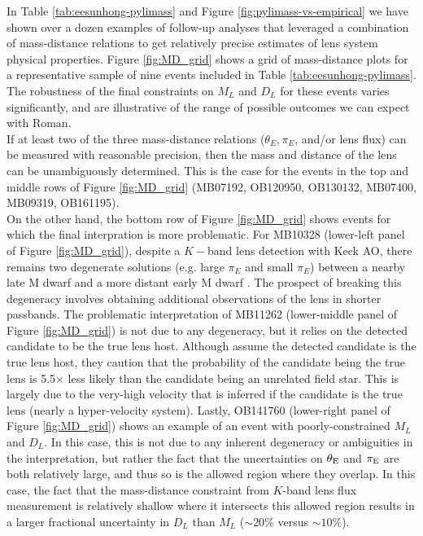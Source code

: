 \documentclass[twocolumn]{aastex631}
\begin{document}
\indent In Table \ref{tab:eesunhong-pylimass} and Figure \ref{fig:pylimass-vs-empirical} we have shown over a dozen examples of follow-up analyses that leveraged a combination of mass-distance relations to get relatively precise estimates of lens system physical properties. Figure \ref{fig:MD_grid} shows a grid of mass-distance plots for a representative sample of nine events included in Table \ref{tab:eesunhong-pylimass}. The robustness of the final constraints on $M_L$ and $D_L$ for these events varies significantly, and are illustrative of the range of possible outcomes we can expect with Roman.\\
\indent If at least two of the three mass-distance relations ($\theta_E, \pi_E$, and/or lens flux) can be measured with reasonable precision, then the mass and distance of the lens can be unambiguously determined. This is the case for the events in the top and middle rows of Figure \ref{fig:MD_grid} (MB07192, OB120950, OB130132, MB07400, MB09319, OB161195).\\
\indent On the other hand, the bottom row of Figure \ref{fig:MD_grid} shows events for which the final interpration is more problematic. For MB10328 (lower-left panel of Figure \ref{fig:MD_grid}), despite a $K-$band lens detection with Keck AO, there remains two degenerate solutions (e.g. large $\pi_E$ and small $\pi_E$) between a nearby late M dwarf and a more distant early M dwarf \citep{vandorou:2025b}. The prospect of breaking this degeneracy involves obtaining additional observations of the lens in shorter passbands. The problematic interpretation of MB11262 (lower-middle panel of Figure \ref{fig:MD_grid}) is not due to any degeneracy, but it relies on the detected candidate to be the true lens host. Although \cite{terry:2025a} assume the detected candidate is the true lens host, they caution that the probability of the candidate being the true lens is 5.5$\times$ less likely than the candidate being an unrelated field star. This is largely due to the very-high velocity that is inferred if the candidate is the true lens (nearly a hyper-velocity system). Lastly, OB141760 (lower-right panel of Figure \ref{fig:MD_grid}) shows an example of an event with poorly-constrained $M_L$ and $D_L$. In this case, this is not due to any inherent degeneracy or ambiguities in the interpretation, but rather the fact that the uncertainties on $\theta_{\rm E}$ and $\pi_{\rm E}$ are both relatively large, and thus so is the allowed region where they overlap. In this case, the fact that the mass-distance constraint from $K$-band lens flux measurement is relatively shallow where it intersects this allowed region results in a larger fractional uncertainty in $D_L$ than $M_L$ ($\sim 20\%$ versus $\sim 10\%$).
\end{document}
